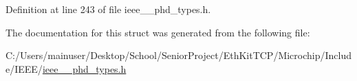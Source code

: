 Definition at line 243 of file ieee\+\_\+\_\+phd\+\_\+types.\+h.



The documentation for this struct was generated from the following file\+:\begin{DoxyCompactItemize}
\item 
C\+:/\+Users/mainuser/\+Desktop/\+School/\+Senior\+Project/\+Eth\+Kit\+T\+C\+P/\+Microchip/\+Include/\+I\+E\+E\+E/\hyperlink{ieee__11073__phd__types_8h}{ieee\+\_\+\_\+phd\+\_\+types.\+h}\end{DoxyCompactItemize}
